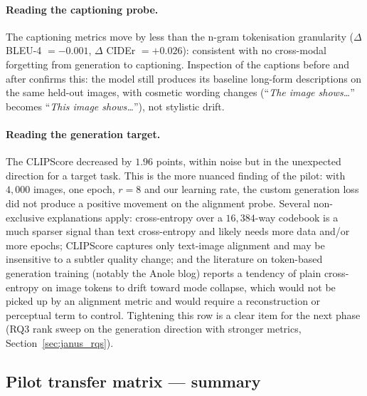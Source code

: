\paragraph{Reading the captioning probe.} The captioning metrics move by less
than the n-gram tokenisation granularity ($\Delta$ BLEU-4 $=-0.001$,
$\Delta$ CIDEr $=+0.026$): consistent with no cross-modal forgetting from
generation to captioning. Inspection of the captions before and after
confirms this: the model still produces its baseline long-form descriptions
on the same held-out images, with cosmetic wording changes
(``\emph{The image shows\dots}'' becomes ``\emph{This image shows\dots}''),
not stylistic drift.

\paragraph{Reading the generation target.} The CLIPScore decreased by
$1.96$ points, within noise but in the unexpected direction for a target
task. This is the more nuanced finding of the pilot: with $4{,}000$ images,
one epoch, $r{=}8$ and our learning rate, the custom generation loss did not
produce a positive movement on the alignment probe. Several non-exclusive
explanations apply: cross-entropy over a $16{,}384$-way codebook is a much
sparser signal than text cross-entropy and likely needs more data and/or
more epochs; CLIPScore captures only text-image alignment and may be
insensitive to a subtler quality change; and the literature on token-based
generation training (notably the Anole blog) reports a tendency of plain
cross-entropy on image tokens to drift toward mode collapse, which would
not be picked up by an alignment metric and would require a reconstruction
or perceptual term to control. Tightening this row is a clear item for the
next phase (RQ3 rank sweep on the generation direction with stronger
metrics, Section~\ref{sec:janus_rqs}).

\subsection{Pilot transfer matrix --- summary}

